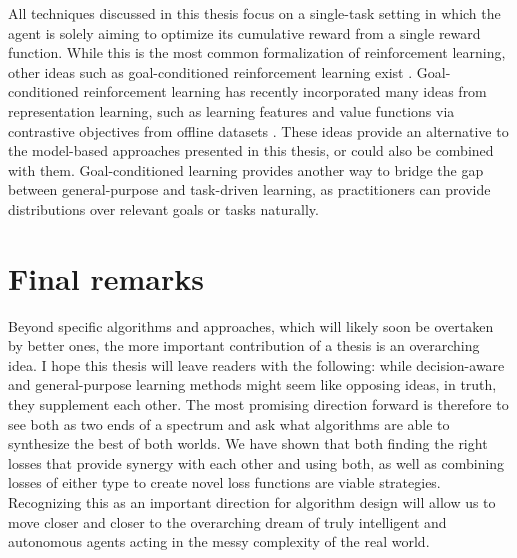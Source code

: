 All techniques discussed in this thesis focus on a single-task setting in which the agent is solely aiming to optimize its cumulative reward from a single reward function.
While this is the most common formalization of reinforcement learning, other ideas such as goal-conditioned reinforcement learning exist \parencite{kaelbling1993learning,schaul2015universal}.
Goal-con\-ditioned reinforcement learning has recently incorporated many ideas from representation learning, such as learning features and value functions via contrastive objectives from offline datasets \parencite{eysenbach2022contrastive}.
These ideas provide an alternative to the model-based approaches presented in this thesis, or could also be combined with them.
Goal-conditioned learning provides another way to bridge the gap between general-purpose and task-driven learning, as practitioners can provide distributions over relevant goals or tasks naturally.

\section{Final remarks}

Beyond specific algorithms and approaches, which will likely soon be overtaken by better ones, the more important contribution of a thesis is an overarching idea.
I hope this thesis will leave readers with the following: while decision-aware and general-purpose learning methods might seem like opposing ideas, in truth, they supplement each other.
The most promising direction forward is therefore to see both as two ends of a spectrum and ask what algorithms are able to synthesize the best of both worlds.
We have shown that both finding the right losses that provide synergy with each other and using both, as well as combining losses of either type to create novel loss functions are viable strategies.
Recognizing this as an important direction for algorithm design will allow us to move closer and closer to the overarching dream of truly intelligent and autonomous agents acting in the messy complexity of the real world.
